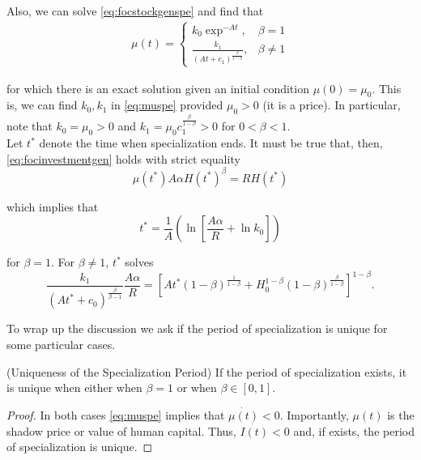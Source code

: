 \indent Also, we can solve \eqref{eq:focstockgenspe} and find that
\begin{eqnarray}
\mu(t) =
\begin{cases}
k_{0} \exp^{-At}, & \beta = 1 \\
\frac{k_{1}}{(At + c_{1})^{\frac{\beta}{1-\beta}}}, & \beta \neq 1 \label{eq:muspe}
\end{cases}
\end{eqnarray}

\noindent for which there is an exact solution given an initial condition $\mu(0) = \mu_{0}$. This is, we can find $k_{0}, k_{1}$ in \eqref{eq:muspe} provided $\mu_{0} > 0$ (it is a price). In particular, note that $k_{0} = \mu_{0} > 0$ and $k_{1} = \mu_{0} c_{1}^{\frac{\beta}{1-\beta}} > 0$ for $0<\beta<1$.\\
\indent Let $t^*$ denote the time when specialization ends. It must be true that, then, \eqref{eq:focinvestmentgen} holds with strict equality
\begin{equation}
\mu(t^*) A \alpha H(t^*)^{\beta} = RH(t^*)
\end{equation}

\noindent which implies that 
\begin{equation}
t^* = \frac{1}{A} \left( \ln \left[ \frac{A\alpha}{R} + \ln k_{0} \right] \right)
\end{equation}

\noindent for $\beta = 1$. For $\beta \neq 1$, $t^*$ solves
\begin{equation}
\frac{k_{1}}{ \left( At^* + c_{0} \right)^{\frac{\beta}{\beta-1}}} \frac{A \alpha}{R} = \left[ At^* \left( 1 - \beta \right)^{\frac{1}{1 - \beta}} + H_{0}^{1 - \beta} \left( 1 - \beta \right)^{\frac{\beta}{1 - \beta}} \right]^{1 - \beta}.
\end{equation}

\indent To wrap up the discussion we ask if the period of specialization is unique for some particular cases.

\begin{claim} (Uniqueness of the Specialization Period)
If the period of specialization exists, it is unique when either when $\beta = 1$ or when $\beta \in [0,1]$. 
\end{claim}

\begin{proof}
In both cases \eqref{eq:muspe} implies that $\dot{\mu(t)} < 0$. Importantly, $\mu(t)$ is the shadow price or value of human capital. Thus, $\dot{I(t)} < 0 $ and, if exists, the period of specialization is unique.
\end{proof}

